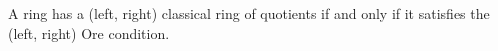 \documentclass[12pt]{article}
\begin{document}
A ring has a (left, right) classical ring of quotients if and only if it satisfies the (left, right) Ore condition.
\end{document}
